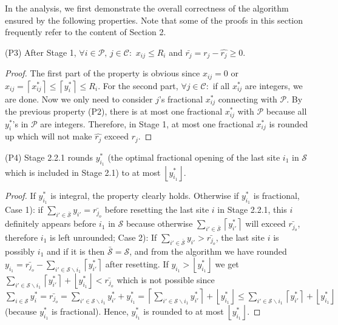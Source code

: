 \documentclass[10pt]{llncs}
\begin{document}
In the analysis, we first demonstrate the overall correctness of the
algorithm ensured by the following properties. Note that some of the
proofs in this section frequently refer to the content of Section
2.

\medskip{}


(P3) After Stage 1, $ $$\forall i\in\mathcal{P},\, j\in\mathcal{C}:$
$x_{ij}\leq R_{i}$ and $\bar{r_{j}}=r_{j}-\hat{r_{j}}\geq0$.
\begin{proof}
The first part of the property is obvious since $x_{ij}=0$ or $x_{ij}=\left\lceil x_{ij}^{*}\right\rceil \leq\left\lceil y_{i}^{*}\right\rceil \leq R_{i}$.
For the second part, $\forall j\in\mathcal{C}:$ if all $x_{ij}^{*}$
are integers, we are done. Now we only need to consider $j$'s fractional
$x_{ij}^{*}$ connecting with $ $$\mathcal{P}$. By the previous
property (P2), there is at most one fractional $x_{ij}^{*}$ with
$\mathcal{P}$ because all $y_{i}^{*}$'s in $\mathcal{P}$ are integers.
Therefore, in Stage 1, at most one fractional $x_{ij}^{*}$ is rounded
up which will not make $\hat{r_{j}}$ exceed $r_{j}$.
\end{proof}


(P4) Stage 2.2.1 rounds $y_{i_{1}}^{*}$ (the optimal fractional opening
of the last site $i_{1}$ in $\mathcal{S}$ which is included in Stage
2.1) to at most $\left\lfloor y_{i_{1}}^{*}\right\rfloor $. 
\begin{proof}
If $y_{i_{1}}^{*}$ is integral, the property clearly holds. Otherwise
if $y_{i_{1}}^{*}$ is fractional, Case 1): if \textbf{$\sum_{i'\in\bar{\mathcal{S}}}y_{i'}=\bar{r_{j_{o}}}$
}before resetting the last site $i$ in Stage 2.2.1, this $i$ definitely
appears before $i_{1}$ in $\mathcal{S}$ because otherwise $\sum_{i'\in\bar{\mathcal{S}}}\left\lceil y_{i'}^{*}\right\rceil $
will exceed $\bar{r_{j_{o}}}$, therefore $i_{1}$ is left unrounded;
Case 2): If \textbf{$\sum_{i'\in\bar{\mathcal{S}}}y_{i'}>\bar{r_{j_{o}}}$},
the last site $i$ is possibly $i_{1}$ and if it is then $\bar{\mathcal{S}}=\mathcal{S}$,
and from the algorithm we have rounded $y_{i_{1}}=\bar{r_{j_{o}}}-\sum_{i'\in\mathcal{S}\backslash i_{1}}\left\lceil y_{i'}^{*}\right\rceil $
after resetting. If $y_{i_{1}}>\left\lfloor y_{i_{1}}^{*}\right\rfloor $
we get $\sum_{i'\in\mathcal{S}\backslash i_{1}}\left\lceil y_{i'}^{*}\right\rceil +\left\lfloor y_{i_{1}}^{*}\right\rfloor <\bar{r_{j_{o}}}$
which is not possible since $\sum_{i\in\mathcal{S}}y_{i}^{*}=\bar{r_{j_{o}}}=\sum_{i'\in\mathcal{S}\backslash i_{1}}y_{i'}^{*}+y_{i_{1}}^{*}=\left\lceil \sum_{i'\in\mathcal{S}\backslash i_{1}}y_{i'}^{*}\right\rceil +\left\lfloor y_{i_{1}}^{*}\right\rfloor \leq\sum_{i'\in\mathcal{S}\backslash i_{1}}\left\lceil y_{i'}^{*}\right\rceil +\left\lfloor y_{i_{1}}^{*}\right\rfloor $
(because $y_{i_{1}}^{*}$ is fractional). Hence, $ $$y_{i_{1}}^{*}$
is rounded to at most $\left\lfloor y_{i_{1}}^{*}\right\rfloor $.
\end{proof}
\end{document}
